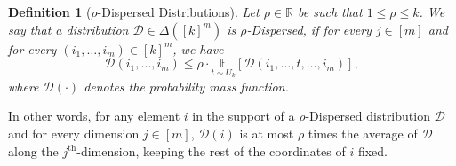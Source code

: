 \documentclass[11pt]{article}
\newtheorem{definition}{Definition}[section]
\newcommand{\sD}{\mathcal{D}}
\begin{document}
\begin{definition}[$\rho$-Dispersed Distributions]\label{def:dispersed}
    Let $\rho\in \mathbb{R}$ be such that $1 \leq \rho \leq k$. We say that a distribution $\sD\in \Delta([k]^{m})$ is $\rho$-Dispersed, if for every $j\in [m]$ and for every $(i_1, \dots, i_m) \in [k]^{m}$, we have 
    \begin{equation*}
        \sD(i_1, \dots, i_m) \leq \rho \cdot \underset{t\sim U_{k}}{\mathbb{E}}[\sD(i_1, \dots, t, \dots, i_m)],
    \end{equation*}
    where $\sD(\cdot)$ denotes the probability mass function.
    
\end{definition}
In other words, for any element $i$ in the support of a $\rho$-Dispersed distribution $\sD$ and for every dimension $j \in [m]$, $\sD(i)$ is at most $\rho$ times the average of $\sD$ along the $j^{\text{th}}$-dimension, keeping the rest of the coordinates of $i$ fixed. 
\end{document}
